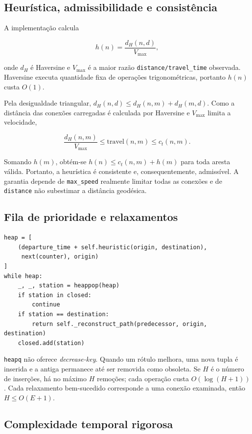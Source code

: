 \documentclass[11pt,a4paper]{article}
\begin{document}
\subsection{Heurística, admissibilidade e consistência}

A implementação calcula

\[
h(n)=\frac{d_H(n,d)}{V_{\max}},
\]

onde $d_H$ é Haversine e $V_{\max}$ é a maior razão
\texttt{distance/travel\_time} observada. Haversine executa quantidade fixa de
operações trigonométricas, portanto $h(n)$ custa $O(1)$.

Pela desigualdade triangular,
$d_H(n,d)\le d_H(n,m)+d_H(m,d)$. Como a distância das conexões carregadas é
calculada por Haversine e $V_{\max}$ limita a velocidade,

\[
\frac{d_H(n,m)}{V_{\max}}
\le \text{travel}(n,m)
\le c_t(n,m).
\]

Somando $h(m)$, obtém-se
$h(n)\le c_t(n,m)+h(m)$ para toda aresta válida. Portanto, a heurística é
consistente e, consequentemente, admissível. A garantia depende de
\texttt{max\_speed} realmente limitar todas as conexões e de
\texttt{distance} não subestimar a distância geodésica.

\subsection{Fila de prioridade e relaxamentos}

\begin{lstlisting}[caption={Núcleo da fila em \texttt{backend/app/route\_simulator.py:67--82}.}]
heap = [
    (departure_time + self.heuristic(origin, destination),
     next(counter), origin)
]
while heap:
    _, _, station = heappop(heap)
    if station in closed:
        continue
    if station == destination:
        return self._reconstruct_path(predecessor, origin, destination)
    closed.add(station)
\end{lstlisting}

\texttt{heapq} não oferece \emph{decrease-key}. Quando um rótulo melhora, uma
nova tupla é inserida e a antiga permanece até ser removida como obsoleta. Se
$H$ é o número de inserções, há no máximo $H$ remoções; cada operação custa
$O(\log(H+1))$. Cada relaxamento bem-sucedido corresponde a uma conexão examinada,
então $H\le O(E+1)$.

\subsection{Complexidade temporal rigorosa}
\end{document}
